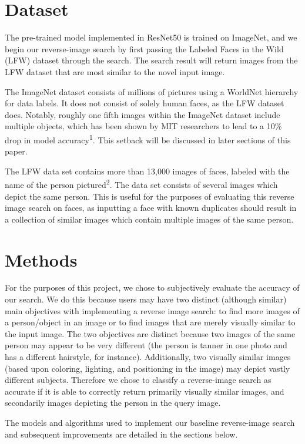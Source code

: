 \documentclass[conference]{IEEEtran}
\begin{document}
\section{Dataset}

The pre-trained model implemented in ResNet50 is trained on ImageNet, and we begin our reverse-image search by first passing the Labeled Faces in the Wild (LFW) dataset through the search. The search result will return images from the LFW dataset that are most similar to the novel input image.

The ImageNet dataset consists of millions of pictures using a WorldNet hierarchy for data labels. It does not consist of solely human faces, as the LFW dataset does. Notably, roughly one fifth images within the ImageNet dataset include multiple objects, which has been shown by MIT researchers to lead to a 10\% drop in model accuracy\textsuperscript{1}. This setback will be discussed in later sections of this paper.

The LFW data set contains more than 13,000 images of faces, labeled with the name of the person pictured\textsuperscript{2}. The data set consists of several images which depict the same person. This is useful for the purposes of evaluating this reverse image search on faces, as inputting a face with known duplicates should result in a collection of similar images which contain multiple images of the same person.

\section{Methods}

For the purposes of this project, we chose to subjectively evaluate the accuracy of our search. We do this because users may have two distinct (although similar) main objectives with implementing a reverse image search: to find more images of a person/object in an image or to find images that are merely visually similar to the input image. The two objectives are distinct because two images of the same person may appear to be very different (the person is tanner in one photo and has a different hairstyle, for instance). Additionally, two visually similar images (based upon coloring, lighting, and positioning in the image) may depict vastly different subjects. Therefore we chose to classify a reverse-image search as accurate if it is able to correctly return primarily visually similar images, and secondarily images depicting the person in the query image.

The models and algorithms used to implement our baseline reverse-image search and subsequent improvements are detailed in the sections below.
\end{document}
